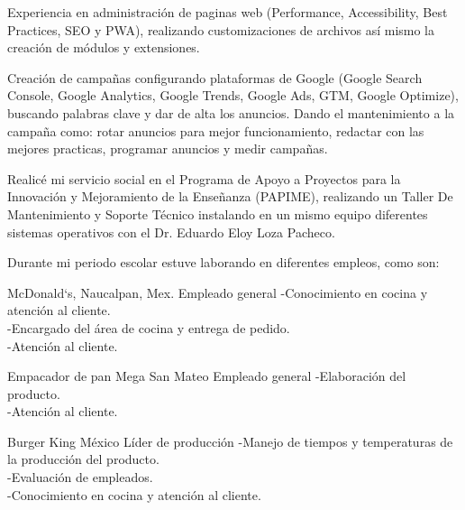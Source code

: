 \documentclass[%
	       doublesided,
	       paper=a4,
	       fontsize=10pt
	      ]{my-resume}
\begin{document}
\vspace{5mm}
Experiencia en administración de paginas web (Performance, Accessibility, Best Practices, SEO y PWA), realizando customizaciones de archivos así mismo la creación de módulos y extensiones.

\vspace{5mm}
Creación de campañas configurando plataformas de Google (Google Search Console, Google Analytics, Google Trends, Google Ads, GTM, Google Optimize),
buscando palabras clave y dar de alta los anuncios. Dando el mantenimiento a la campaña como: rotar anuncios para mejor funcionamiento, redactar con las mejores practicas, programar anuncios y medir campañas.

\vspace{5mm}
Realicé mi servicio social en el Programa de Apoyo a Proyectos para la Innovación y Mejoramiento de la Enseñanza (PAPIME), realizando un Taller De Mantenimiento y Soporte Técnico instalando en un mismo equipo diferentes sistemas operativos con el Dr. Eduardo Eloy Loza Pacheco.

\vspace{5mm}
Durante mi periodo escolar estuve laborando en diferentes empleos, como son:
\vspace{3mm}


{McDonald`s, Naucalpan, Mex.}
{Empleado general}
{
-Conocimiento en cocina y atención al cliente.\\
-Encargado del área de cocina y entrega de pedido.\\
-Atención al cliente.
}

{Empacador de pan Mega San Mateo}
{Empleado general}
{
-Elaboración del producto.\\
-Atención al cliente.
}

{Burger King México}
{Líder de producción}
{
-Manejo de tiempos y temperaturas de la producción del producto.\\
-Evaluación de empleados.\\
-Conocimiento en cocina y atención al cliente.
}
\end{document}
